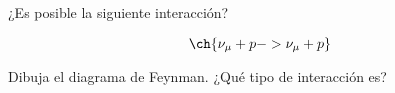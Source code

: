 \documentclass[./../main.tex]{subfiles}
\begin{document}
	\begin{exercise}
		¿Es posible la siguiente interacción?

		\begin{equation*}
			\ch{\nu_{\mu} + p -> \nu_{\mu} + p}
		\end{equation*}

		Dibuja el diagrama de Feynman. ¿Qué tipo de interacción es?
	\end{exercise}
\end{document}
